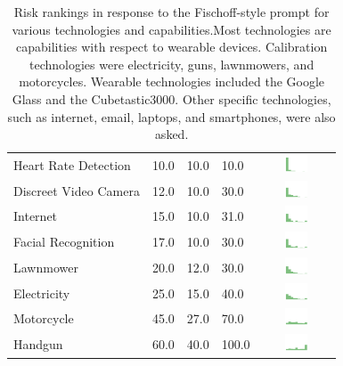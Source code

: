 \begin{table}[h!!!!]
\begin{center}
\begin{tabular}{| p{2cm} | p{1cm} | p{1cm} | p{1cm} | c |}
Heart Rate Detection & 10.0 & 10.0 & 10.0 & \includegraphics[width = 2cm, height = 0.5cm]{tex-inputs/table-images/heartratedetectionrisk} \\ 
Discreet Video Camera & 12.0 & 10.0 & 30.0 & \includegraphics[width = 2cm, height = 0.5cm]{tex-inputs/table-images/discreetvideocamerarisk} \\ 
Internet & 15.0 & 10.0 & 31.0 & \includegraphics[width = 2cm, height = 0.5cm]{tex-inputs/table-images/internetrisk} \\ 
Facial Recognition & 17.0 & 10.0 & 30.0 & \includegraphics[width = 2cm, height = 0.5cm]{tex-inputs/table-images/facialrecognitionrisk} \\ 
Lawnmower & 20.0 & 12.0 & 30.0 & \includegraphics[width = 2cm, height = 0.5cm]{tex-inputs/table-images/LawnmowerRisk} \\ 
Electricity & 25.0 & 15.0 & 40.0 & \includegraphics[width = 2cm, height = 0.5cm]{tex-inputs/table-images/ElectricityRisk} \\ 
Motorcycle & 45.0 & 27.0 & 70.0 & \includegraphics[width = 2cm, height = 0.5cm]{tex-inputs/table-images/MotorcycleRisk} \\ 
Handgun & 60.0 & 40.0 & 100.0 & \includegraphics[width = 2cm, height = 0.5cm]{tex-inputs/table-images/HandgunRisk} \\ 
\hline
\end{tabular}
\caption{Risk rankings in response to the Fischoff-style prompt for various technologies and capabilities.Most technologies are capabilities with respect to wearable devices. Calibration technologies were electricity, guns, lawnmowers, and motorcycles. Wearable technologies included the Google Glass and the Cubetastic3000. Other specific technologies, such as internet, email, laptops, and smartphones, were also asked.}
\label{risk}
\end{center}
\end{table}

